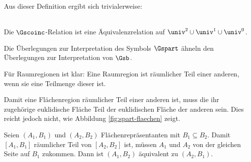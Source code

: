 %        
        Aus dieser Definition ergibt sich trivialerweise:
%        
        \begin{satz}\ \\
            Die $\Gscoinc$-Relation ist eine Äquivalenzrelation auf $\univ^2 \cup \univ^1 \cup \univ^0$.
        \end{satz}
%    
        Die
        \marginpar{$\Gspart$}
        Überlegungen zur Interpretation des Symbols $\Gspart$ ähneln den Überlegungen zur Interpretation von $\Gsb$.
    
        Für Raumregionen ist klar: Eine Raumregion ist räumlicher Teil einer anderen, wenn sie eine Teilmenge dieser ist.
    
        Damit eine Flächenregion räumlicher Teil einer anderen ist, muss die ihr zugehörige euklidische Fläche Teil der euklidischen Fläche der anderen sein.
        Dies reicht jedoch nicht, wie Abbildung \ref{fig:spart-flaechen} zeigt.
        
        Seien $(A_1,B_1)$ und $(A_2,B_2)$ Flächenrepräsentanten mit $B_1 \subseteq B_2$. Damit $[A_1,B_1]$ räumlicher Teil von $[A_2,B_2]$ ist, müssen $A_1$ und $A_2$ von der gleichen Seite auf $B_1$ zukommen. Dann ist $(A_1,B_2)$ äquivalent zu $(A_2, B_1)$.
            
